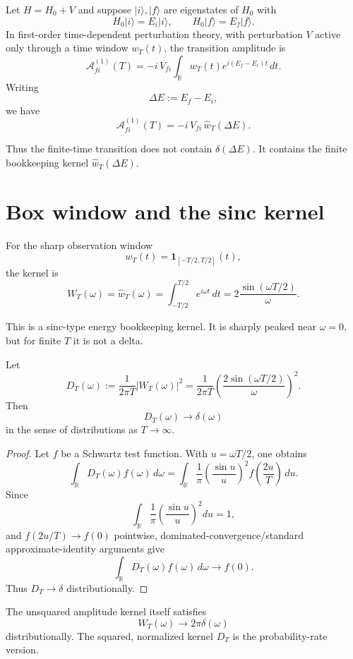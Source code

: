 \documentclass[11pt]{article}
\begin{document}
Let \(H=H_0+V\) and suppose \(|i\rangle,|f\rangle\) are eigenstates of \(H_0\) with
\[
H_0|i\rangle=E_i|i\rangle,\qquad H_0|f\rangle=E_f|f\rangle.
\]
In first-order time-dependent perturbation theory, with perturbation \(V\) active only through a time window \(w_T(t)\), the transition amplitude is
\[
\mathcal A_{fi}^{(1)}(T)
=
-i\,V_{fi}\int_{\mathbb R} w_T(t)e^{i(E_f-E_i)t}\,dt.
\]
Writing
\[
\Delta E:=E_f-E_i,
\]
we have
\[
\mathcal A_{fi}^{(1)}(T)
=
-i\,V_{fi}\,\widehat w_T(\Delta E).
\]

Thus the finite-time transition does not contain \(\delta(\Delta E)\).  It contains the finite bookkeeping kernel \(\widehat w_T(\Delta E)\).

\section{Box window and the sinc kernel}

For the sharp observation window
\[
w_T(t)=\mathbf 1_{[-T/2,T/2]}(t),
\]
the kernel is
\[
W_T(\omega)=\widehat w_T(\omega)
=
\int_{-T/2}^{T/2}e^{i\omega t}\,dt
=
2\frac{\sin(\omega T/2)}{\omega}.
\]

This is a sinc-type energy bookkeeping kernel.  It is sharply peaked near \(\omega=0\), but for finite \(T\) it is not a delta.

\begin{theorem}
Let
\[
D_T(\omega):=\frac{1}{2\pi T}|W_T(\omega)|^2
=
\frac{1}{2\pi T}\left(\frac{2\sin(\omega T/2)}{\omega}\right)^2.
\]
Then
\[
D_T(\omega)\to \delta(\omega)
\]
in the sense of distributions as \(T\to\infty\).
\end{theorem}

\begin{proof}
Let \(f\) be a Schwartz test function.  With \(u=\omega T/2\), one obtains
\[
\int_{\mathbb R}D_T(\omega)f(\omega)\,d\omega
=
\int_{\mathbb R}\frac{1}{\pi}\left(\frac{\sin u}{u}\right)^2
f\!\left(\frac{2u}{T}\right)\,du.
\]
Since
\[
\int_{\mathbb R}\frac{1}{\pi}\left(\frac{\sin u}{u}\right)^2du=1,
\]
and \(f(2u/T)\to f(0)\) pointwise, dominated-convergence/standard approximate-identity arguments give
\[
\int_{\mathbb R}D_T(\omega)f(\omega)\,d\omega\to f(0).
\]
Thus \(D_T\to\delta\) distributionally.
\end{proof}

The unsquared amplitude kernel itself satisfies
\[
W_T(\omega)\to 2\pi\delta(\omega)
\]
distributionally.  The squared, normalized kernel \(D_T\) is the probability-rate version.
\end{document}
